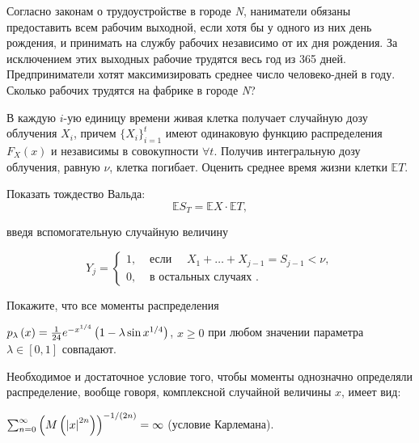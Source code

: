 \begin{problem}
Согласно законам о трудоустройстве в городе \textit{N}, наниматели обязаны предоставить всем рабочим выходной, если хотя бы у одного из них день рождения, и принимать на службу рабочих независимо от их дня рождения. За исключением этих выходных рабочие трудятся весь год из 365 дней. Предприниматели хотят максимизировать среднее число человеко-дней в году. Сколько рабочих трудятся на фабрике в городе \textit{N}?

\end{problem}

\begin{problem}
В каждую $i$-ую единицу времени живая клетка получает случайную дозу облучения $X_i$, причем $\{ X_i\}_{i=1}^{t}$ имеют 
одинаковую функцию распределения $F_X(x)$ и независимы в совокупности $\forall t$. Получив интегральную дозу облучения, 
равную $\nu$, клетка погибает. Оценить среднее время жизни клетки ${\mathbb E}T$. 
\end{problem}

\begin{ordre}

Показать тождество Вальда: 
$$
{\mathbb E}S_T={\mathbb E}X\cdot {\mathbb E}T, 
$$

введя вспомогательную случайную величину

$$
Y_j=\begin{cases}
1, &\text{ если }\quad X_1+\ldots +X_{j-1}=S_{j-1}<\nu, \\
0, &\text{ в остальных случаях }. 
\end{cases}
$$
 

\end{ordre}

\begin{problem}

Покажите, что все моменты распределения

 $p_{\lambda } \left(x\right)=\frac{1}{24} e^{-x^{{1\mathord{\left/ {\vphantom {1 4}} \right. \kern-\nulldelimiterspace} 4} } } \left(1-\lambda \sin x^{{1\mathord{\left/ {\vphantom {1 4}} \right. \kern-\nulldelimiterspace} 4} } \right)$, $x\ge 0$ при любом значении параметра $\lambda \in \left[0,1\right]$ совпадают.

\begin{remark}

Необходимое и достаточное условие того, чтобы моменты однозначно определяли распределение, вообще говоря, комплексной случайной величины $x$, имеет вид:

\noindent $\sum _{n=0}^{\infty }\left(M\left(\left|x\right|^{2n} \right)\right)^{{-1\mathord{\left/ {\vphantom {-1 \left(2n\right)}} \right. \kern-\nulldelimiterspace} \left(2n\right)} } =\infty  $ (условие Карлемана).
\end{remark}

\end{problem} 

